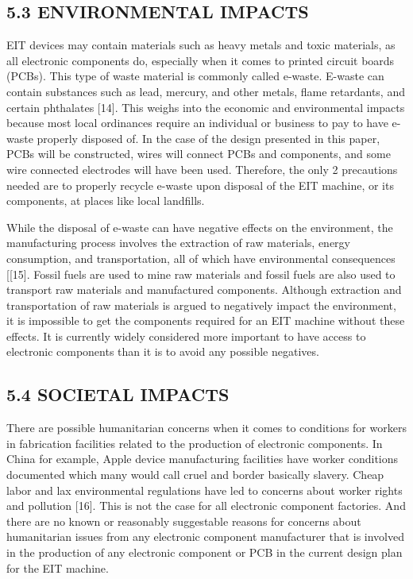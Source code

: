 \subsection*{5.3 ENVIRONMENTAL IMPACTS~}\label{environmental-impacts}

EIT devices may contain materials such as heavy metals and toxic
materials, as all electronic components do, especially when it comes to
printed circuit boards (PCBs). This type of waste material is commonly
called e-waste. E-waste can contain substances such as lead, mercury,
and other metals, flame retardants, and certain phthalates {[}14{]}.
This weighs into the economic and environmental impacts because most
local ordinances require an individual or business to pay to have
e-waste properly disposed of. In the case of the design presented in
this paper, PCBs will be constructed, wires will connect PCBs and
components, and some wire connected electrodes will have been used.
Therefore, the only 2 precautions needed are to properly recycle e-waste
upon disposal of the EIT machine, or its components, at places like
local landfills.

While the disposal of e-waste can have negative effects on the
environment, the manufacturing process involves the extraction of raw
materials, energy consumption, and transportation, all of which have
environmental consequences {[}{[}15{]}. Fossil fuels are used to mine
raw materials and fossil fuels are also used to transport raw materials
and manufactured components. Although extraction and transportation of
raw materials is argued to negatively impact the environment, it is
impossible to get the components required for an EIT machine without
these effects. It is currently widely considered more important to have
access to electronic components than it is to avoid any possible
negatives.

\subsection*{5.4 SOCIETAL IMPACTS~}\label{societal-impacts}

There are possible humanitarian concerns when it comes to conditions for
workers in fabrication facilities related to the production of
electronic components. In China for example, Apple device manufacturing
facilities have worker conditions documented which many would call cruel
and border basically slavery. Cheap labor and lax environmental
regulations have led to concerns about worker rights and pollution
{[}16{]}. This is not the case for all electronic component factories.
And there are no known or reasonably suggestable reasons for concerns
about humanitarian issues from any electronic component manufacturer
that is involved in the production of any electronic component or PCB in
the current design plan for the EIT machine.

